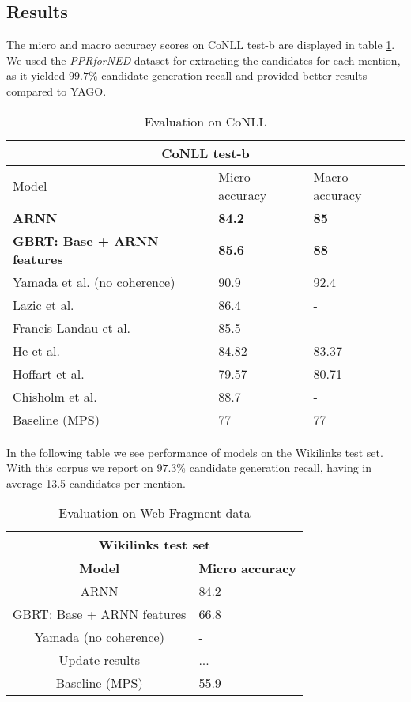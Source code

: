 \documentclass[11pt]{article}
\begin{document}
	\subsection{Results}
	
	The micro and macro accuracy scores on CoNLL test-b are displayed in table \ref{tab:a}. We used the \textit{PPRforNED} dataset \cite{Pershina2015} for extracting the candidates for each mention, as it yielded $99.7$\% candidate-generation recall and provided better results compared to YAGO. 
	
	
	\begin{table}[h]
		\begin{center}
			\begin{tabular}{|p{4cm}| p{1.5cm} p{1.5cm}|}
				\hline \multicolumn{3}{|c|}{CoNLL test-b} \\
				\hline Model & Micro     accuracy & Macro     accuracy \\ \hline
				\bf ARNN  & \bf 84.2 & \bf 85 \\
				\bf GBRT: Base + ARNN features & \bf 85.6 & \bf 88 \\
				Yamada et al. (no coherence) & 90.9 & 92.4 \\
				Lazic et al. & 86.4 & - \\
				Francis-Landau et al. & 85.5 & - \\
				He et al. & 84.82 & 83.37 \\	
				Hoffart et al. & 79.57 & 80.71 \\
				Chisholm et al. & 88.7 & - \\			
				Baseline (MPS) & 77 & 77 \\
				\hline
			\end{tabular}
		\end{center}
		\caption{\label{tab:a} Evaluation on CoNLL}
	\end{table}

	In the following table we see performance of models on the Wikilinks test set. With this corpus we report on $97.3$\% candidate generation recall, having in average 13.5 candidates per mention.
	 
	\begin{table}[h]
	\begin{center}
		\begin{tabular}{|c| p{1.5cm}|}
			\hline \multicolumn{2}{|c|}{Wikilinks test set} \\
			\hline \bf Model & \bf Micro     accuracy  \\ \hline
			ARNN  & 84.2\\
			GBRT: Base + ARNN features & 66.8 \\
			Yamada (no coherence) & -  \\
			Update results & ... \\
			Baseline (MPS) & 55.9 \\
			\hline
		\end{tabular}
	\end{center}
	\caption{\label{font-table} Evaluation on Web-Fragment data}
	\end{table}
\end{document}
